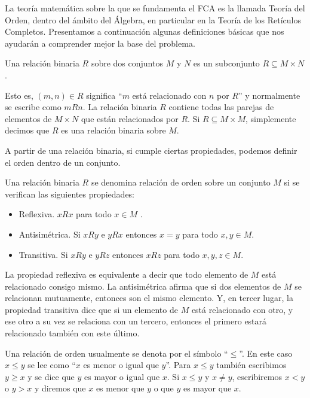 \documentclass[oneside,openright,titlepage,numbers=noenddot,openany,headinclude,footinclude=true,
cleardoublepage=empty,abstractoff,BCOR=5mm,paper=a4,fontsize=12pt,main=spanish]{scrreprt}
\begin{document}
La teoría matemática sobre la que se fundamenta el FCA es la llamada Teoría del Orden, dentro del ámbito del Álgebra, en particular en la Teoría de los Retículos Completos. Presentamos a continuación algunas definiciones básicas que nos ayudarán a comprender mejor la base del problema. 

\begin{definition} Una relación binaria $R$ sobre dos conjuntos $M$ y $N$ es un subconjunto $R \subseteq M \times N$ .
\end{definition}

Esto es,  $ (m,n) \in R$ significa ``$m$ está relacionado con $n$ por $R$'' y normalmente se escribe como $ mRn$. La relación binaria $R$ contiene todas las parejas de elementos de $M \times N$ que están relacionados por $R$. Si $ R \subseteq M \times M$, simplemente decimos que $R$ es una relación binaria sobre $M$. 

A partir de una relación binaria, si cumple ciertas propiedades, podemos definir el orden dentro de un conjunto.

\begin{definition} Una relación binaria $R$ se denomina relación de orden sobre un conjunto $M$ si se verifican las siguientes propiedades:

\begin{itemize}
    \item Reflexiva. $ x R x$ para todo $ x \in M$ .
    \item Antisimétrica. Si $ x R y$ e $ y R x$ entonces $ x = y$ para todo $x , y \in M$.
    \item Transitiva. Si $x R y $ e $ y R z$ entonces $ x R z$ para todo $x,y,z \in M$.
\end{itemize}

\end{definition}

La propiedad reflexiva es equivalente a decir que todo elemento de $M$ está relacionado consigo mismo. La antisimétrica afirma que si dos elementos de $M$ se relacionan mutuamente, entonces son el mismo elemento. Y, en tercer lugar, la propiedad transitiva dice que si un elemento de $M$ está relacionado con otro, y ese otro a su vez se relaciona con un tercero, entonces el primero estará relacionado también con este último.

Una relación de orden usualmente se denota por el símbolo  ``$\leq$''. En este caso $x \leq y$ se lee como ``$x $ es menor o igual que $y$''. Para $x \leq y $ también escribimos $ y\geq x$ y se dice que $y$ es mayor o igual que $x$. Si $x \leq y$ y $x \neq y $, escribiremos $x < y $ o $y > x$ y diremos que $x$ es menor  que $ y $ o que $y$ es mayor que $x$.
\end{document}
